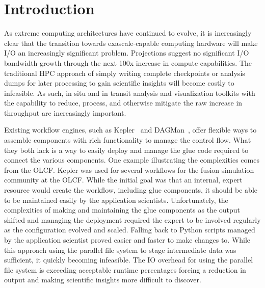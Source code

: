 \documentclass[conference]{IEEEtran}
\begin{document}

\section{Introduction}
\label{s:intro}

As extreme computing architectures have continued to evolve, it is increasingly
clear that the transition towards exascale-capable computing hardware will make
I/O an increasingly significant problem.  Projections suggest no significant
I/O bandwidth growth through the next 100x increase in compute capabilities.
The traditional HPC approach of simply writing complete checkpoints or analysis
dumps for later processing to gain scientific insights will become costly to
infeasible.  As such, in situ and in transit analysis and visualization
toolkits with the capability to reduce, process, and otherwise mitigate the raw
increase in throughput are increasingly important.

Existing workflow engines, such as Kepler~\cite{bertram:2006:kepler} and
DAGMan~\cite{Malewicz:2006:dagman}, offer flexible ways to assemble components
with rich functionality to manage the control flow. What they both lack is a
way to easily deploy and manage the glue code required to connect the various
components. One example illustrating the complexities comes from the OLCF.
Kepler was used for several workflows for the fusion simulation community at
the OLCF.  While the initial goal was that an internal, expert resource would
create the workflow, including glue components, it should be able to be
maintained easily by the application scientists. Unfortunately, the
complexities of making and maintaining the glue components as the output
shifted and managing the deployment required the expert to be involved
regularly as the configuration evolved and scaled.  Falling back to Python
scripts managed by the application scientist proved easier and faster to make
changes to. While this approach using the parallel file system to stage
intermediate data was sufficient, it quickly becoming infeasible. The IO
overhead for using the parallel file system is exceeding acceptable runtime
percentages forcing a reduction in output and making scientific insights more
difficult to discover.
\end{document}
